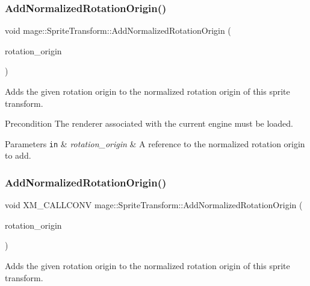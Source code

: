 \subsubsection{\texorpdfstring{Add\+Normalized\+Rotation\+Origin()}{AddNormalizedRotationOrigin()}\hspace{0.1cm}{\footnotesize\ttfamily [2/3]}}
{\footnotesize\ttfamily void mage\+::\+Sprite\+Transform\+::\+Add\+Normalized\+Rotation\+Origin (\begin{DoxyParamCaption}\item[{const X\+M\+F\+L\+O\+A\+T2 \&}]{rotation\+\_\+origin }\end{DoxyParamCaption})}

Adds the given rotation origin to the normalized rotation origin of this sprite transform.

\begin{DoxyPrecond}{Precondition}
The renderer associated with the current engine must be loaded. 
\end{DoxyPrecond}

\begin{DoxyParams}[1]{Parameters}
\mbox{\tt in}  & {\em rotation\+\_\+origin} & A reference to the normalized rotation origin to add. \\
\hline
\end{DoxyParams}
\hypertarget{structmage_1_1_sprite_transform_a5571cc3e5700aba23f8c229675f10c3e}{}\label{structmage_1_1_sprite_transform_a5571cc3e5700aba23f8c229675f10c3e} 
\subsubsection{\texorpdfstring{Add\+Normalized\+Rotation\+Origin()}{AddNormalizedRotationOrigin()}\hspace{0.1cm}{\footnotesize\ttfamily [3/3]}}
{\footnotesize\ttfamily void X\+M\+\_\+\+C\+A\+L\+L\+C\+O\+NV mage\+::\+Sprite\+Transform\+::\+Add\+Normalized\+Rotation\+Origin (\begin{DoxyParamCaption}\item[{F\+X\+M\+V\+E\+C\+T\+OR}]{rotation\+\_\+origin }\end{DoxyParamCaption})}

Adds the given rotation origin to the normalized rotation origin of this sprite transform.

